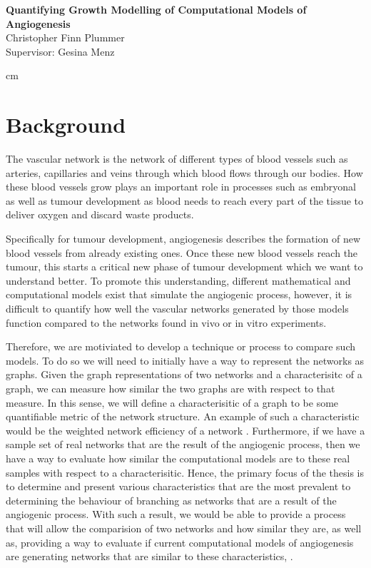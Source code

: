 \documentclass{article}
\begin{document}
\noindent
\begin{center}
{\Large{\bf Quantifying Growth Modelling of Computational Models of Angiogenesis\\}}
\vspace{0.2 cm}
{\large Christopher Finn Plummer} \\
{\small Supervisor: Gesina Menz}
\end{center}
 cm

\section{Background}
The vascular network is the network of different types of blood vessels such as
arteries, capillaries and veins through which blood flows through our bodies.
How these blood vessels grow plays an important role in processes such as
embryonal as well as tumour development as blood needs to reach
every part of the tissue to deliver oxygen and discard waste products.

Specifically for tumour development, angiogenesis describes the formation of new
blood vessels from already existing ones. Once these new blood vessels reach 
the tumour, this starts a critical new phase of tumour development which we want
to understand better. To promote this understanding,
different mathematical and computational models exist that simulate the
angiogenic process, however, it is difficult to quantify how well the vascular
networks generated by those models function compared to the networks found in
vivo or in vitro experiments.

Therefore, we are motiviated to develop a technique or process to compare
such models. To do so we will need to initially have a way to represent the
networks as graphs. Given the graph representations of two networks
and a characterisitc of a graph, we can measure how similar the two graphs
are with respect to that measure. In this sense, we will define a
characterisitic of a graph to be some quantifiable metric of the
network structure. An example of such a characteristic would be the
weighted network efficiency of a network \cite{ref1}. Furthermore,
if we have a sample set of real networks that are the
result of the angiogenic process, then we have a way to evaluate how
similar the computational models are to these real samples with respect
to a characterisitic. Hence, the primary focus of the thesis is to determine
and present various characteristics that are the most prevalent to determining
the behaviour of branching as networks that are a result of the angiogenic
process. With such a result, we would be able to provide a process that
will allow the comparision of two networks and how similar they are,
as well as, providing a way to evaluate if current computational models
of angiogenesis are generating networks that are similar to these
characteristics, \cite{ref2}.
\end{document}
